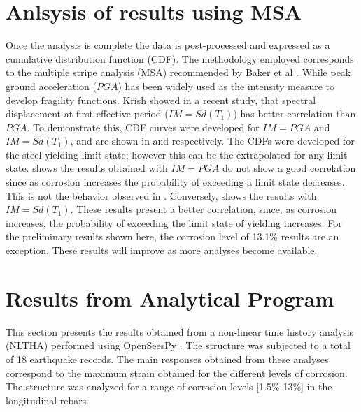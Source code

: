 \section{Anlsysis of results using MSA}

Once the analysis is complete the data is post-processed and expressed as a cumulative distribution function (CDF). The methodology employed corresponds to the multiple stripe analysis (MSA) recommended by Baker et al \cite{Baker2015}. While peak ground acceleration ($PGA$) has been widely used as the intensity measure to develop fragility functions\cite{Ghosh2015}\cite{Bisadi2015}\cite{Shekhar2018}. Krish \cite{Krish2018} showed in a recent study, that spectral displacement at first effective period ($IM=Sd(T_1)$) has better correlation than $PGA$. To demonstrate this, CDF curves were developed for $IM=PGA$ and $IM=Sd(T_1)$, and are shown in  and  respectively. The CDFs were developed for the steel yielding limit state; however this can be the extrapolated for any limit state.  shows the results obtained with $IM=PGA$ do not show a good correlation since as corrosion increases the probability of exceeding a limit state decreases. This is not the behavior observed in . Conversely,  shows the results with $IM=Sd(T_1)$. These results present a better correlation, since, as corrosion increases, the probability of exceeding the limit state of yielding increases. For the preliminary results shown here, the corrosion level of 13.1\% results are an exception. These results will improve as more analyses become available. 

%
%
\section{Results from Analytical Program}
This section presents the results obtained from a non-linear time history analysis (NLTHA) performed using OpenSeesPy \cite{Zhu2018}. The structure was subjected to a total of 18 earthquake records. The main responses obtained from these analyses correspond to the maximum strain obtained for the different levels of corrosion. The structure was analyzed for a range of corrosion levels [1.5\%-13\%] in the longitudinal rebars.

